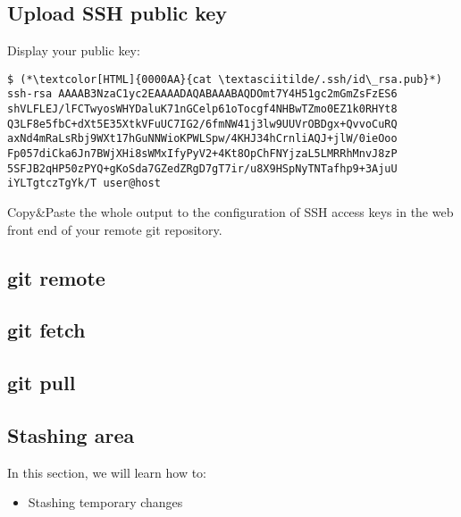 \subsection{Upload SSH public key}
\begin{frame}[fragile]
  \subslidetitle
  Display your public key:
  \begin{lstlisting}
$ (*\textcolor[HTML]{0000AA}{cat \textasciitilde/.ssh/id\_rsa.pub}*)
ssh-rsa AAAAB3NzaC1yc2EAAAADAQABAAABAQDOmt7Y4H51gc2mGmZsFzES6
shVLFLEJ/lFCTwyosWHYDaluK71nGCelp61oTocgf4NHBwTZmo0EZ1k0RHYt8
Q3LF8e5fbC+dXt5E35XtkVFuUC7IG2/6fmNW41j3lw9UUVrOBDgx+QvvoCuRQ
axNd4mRaLsRbj9WXt17hGuNNWioKPWLSpw/4KHJ34hCrnliAQJ+jlW/0ieOoo
Fp057diCka6Jn7BWjXHi8sWMxIfyPyV2+4Kt8OpChFNYjzaL5LMRRhMnvJ8zP
5SFJB2qHP50zPYQ+gKoSda7GZedZRgD7gT7ir/u8X9HSpNyTNTafhp9+3AjuU
iYLTgtczTgYk/T user@host
\end{lstlisting}
  Copy\&Paste the whole output to the configuration of SSH access keys
  in the web front end of your remote git repository.
\end{frame}

\subsection{git remote}
\begin{frame}[fragile]
  \subslidetitle
\end{frame}

\subsection{git fetch}
\begin{frame}[fragile]
    \subslidetitle
\end{frame}

\subsection{git pull}
\begin{frame}[fragile]
    \subslidetitle
\end{frame}

\subsection{Stashing area}
\begin{frame}[fragile]
  \slidetitle

  In this section, we will learn how to:
  \begin{itemize}
    \item Stashing temporary changes
  \end{itemize}
\end{frame}


